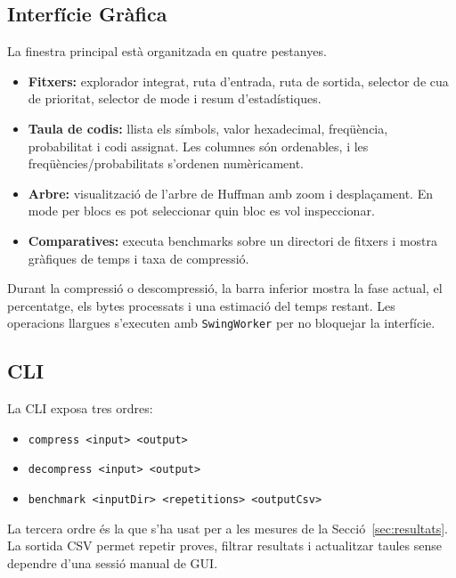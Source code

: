 \documentclass[conference,compsoc]{IEEEtran}
\begin{document}
\subsection{Interfície Gràfica}

La finestra principal està organitzada en quatre pestanyes.

\begin{itemize}
    \item \textbf{Fitxers:} explorador integrat, ruta d'entrada, ruta de
          sortida, selector de cua de prioritat, selector de mode i resum
          d'estadístiques.
    \item \textbf{Taula de codis:} llista els símbols, valor hexadecimal,
          freqüència, probabilitat i codi assignat. Les columnes són
          ordenables, i les freqüències/probabilitats s'ordenen
          numèricament.
    \item \textbf{Arbre:} visualització de l'arbre de Huffman amb zoom i
          desplaçament. En mode per blocs es pot seleccionar quin bloc es
          vol inspeccionar.
    \item \textbf{Comparatives:} executa benchmarks sobre un directori de
          fitxers i mostra gràfiques de temps i taxa de compressió.
\end{itemize}

Durant la compressió o descompressió, la barra inferior mostra la fase
actual, el percentatge, els bytes processats i una estimació del temps
restant. Les operacions llargues s'executen amb \texttt{SwingWorker} per
no bloquejar la interfície.

\subsection{CLI}

La CLI exposa tres ordres:

\begin{itemize}
    \item \texttt{compress <input> <output>}
    \item \texttt{decompress <input> <output>}
    \item \texttt{benchmark <inputDir> <repetitions> <outputCsv>}
\end{itemize}

La tercera ordre és la que s'ha usat per a les mesures de la
Secció~\ref{sec:resultats}. La sortida CSV permet repetir proves, filtrar
resultats i actualitzar taules sense dependre d'una sessió manual de GUI.
\end{document}
